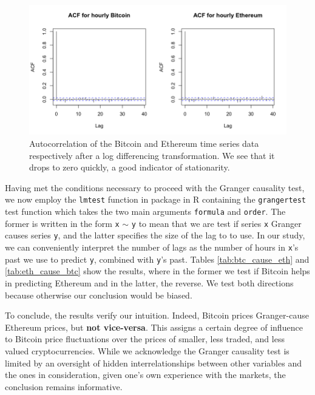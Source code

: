 \documentclass[twoside]{report}
\newcommand{\code}{\texttt}
\begin{document}
\begin{spacing}{1}
\begin{figure}[!htbp]
    \centering
    \includegraphics[width=\linewidth]{Causality_between_time_series/acf_btc_eth.png}
    \caption{Autocorrelation of the Bitcoin and Ethereum time series data respectively after a log differencing transformation. We see that it drops to zero quickly, a good indicator of stationarity.}
    \label{fig:acf_btc_eth}
\end{figure}

Having met the conditions necessary to proceed with the Granger causality test, we now employ the \code{lmtest} function in package in R containing the \code{grangertest} test function which takes the two main arguments \code{formula} and \code{order}. The former is written in the form \code{x} $\sim$ \code{y} to mean that we are test if series \code{x} Granger causes series \code{y}, and the latter specifies the size of the lag to to use. In our study, we can conveniently interpret the number of lags as the number of hours in \code{x}'s past we use to predict \code{y}, combined with \code{y}'s past. Tables \ref{tab:btc_cause_eth} and \ref{tab:eth_cause_btc} show the results, where in the former we test if Bitcoin helps in predicting Ethereum and in the latter, the reverse. We test both directions because otherwise our conclusion would be biased. 

To conclude, the results verify our intuition. Indeed, Bitcoin prices Granger-cause Ethereum prices, but \textbf{not vice-versa}. This assigns a certain degree of influence to Bitcoin price fluctuations over the prices of smaller, less traded, and less valued cryptocurrencies. While we acknowledge the Granger causality test is limited by an oversight of hidden interrelationships between other variables and the ones in consideration, given one's own experience with the markets, the conclusion remains informative.    


\end{spacing}
\end{document}
